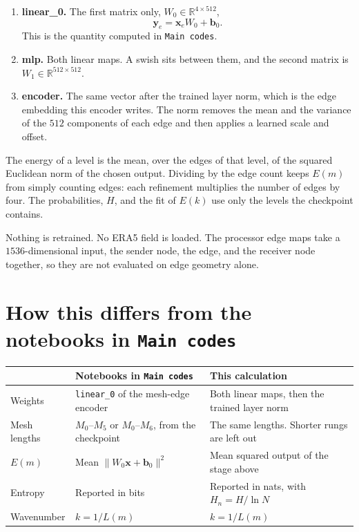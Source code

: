 \documentclass[11pt]{article}
\begin{document}
\begin{enumerate}
\item \textbf{linear\_0.} The first matrix only, \(W_0 \in \mathbb{R}^{4 \times 512}\),
\[
\mathbf{y}_e = \mathbf{x}_e W_0 + \mathbf{b}_0.
\]
This is the quantity computed in \texttt{Main codes}.
\item \textbf{mlp.} Both linear maps. A swish sits between them, and the second matrix is \(W_1 \in \mathbb{R}^{512 \times 512}\).
\item \textbf{encoder.} The same vector after the trained layer norm, which is the edge embedding this encoder writes. The norm removes the mean and the variance of the \(512\) components of each edge and then applies a learned scale and offset.
\end{enumerate}

The energy of a level is the mean, over the edges of that level, of the squared Euclidean norm of the chosen output. Dividing by the edge count keeps \(E(m)\) from simply counting edges: each refinement multiplies the number of edges by four. The probabilities, \(H\), and the fit of \(E(k)\) use only the levels the checkpoint contains.

Nothing is retrained. No ERA5 field is loaded. The processor edge maps take a \(1536\)-dimensional input, the sender node, the edge, and the receiver node together, so they are not evaluated on edge geometry alone.

\section{How this differs from the notebooks in \texttt{Main codes}}

\begin{tabularx}{\textwidth}{@{}lXX@{}}
\toprule
& Notebooks in \texttt{Main codes} & This calculation \\
\midrule
Weights
  & \texttt{linear\_0} of the mesh-edge encoder
  & Both linear maps, then the trained layer norm \\
Mesh lengths
  & \(M_0\)--\(M_5\) or \(M_0\)--\(M_6\), from the checkpoint
  & The same lengths. Shorter rungs are left out \\
\(E(m)\)
  & Mean \(\|W_0\mathbf{x}+\mathbf{b}_0\|^2\)
  & Mean squared output of the stage above \\
Entropy
  & Reported in bits
  & Reported in nats, with \(H_n = H/\ln N\) \\
Wavenumber
  & \(k = 1/L(m)\)
  & \(k = 1/L(m)\) \\
\bottomrule
\end{tabularx}
\end{document}

